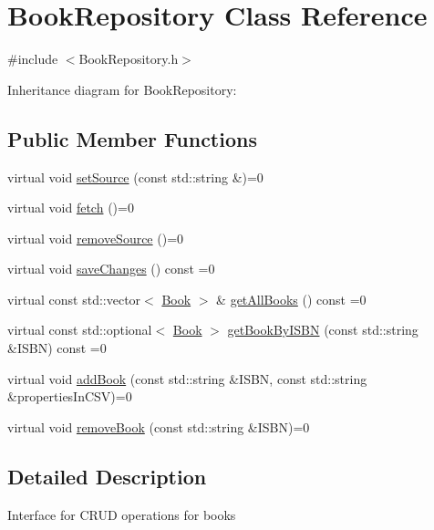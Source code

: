 \hypertarget{classBookRepository}{}\section{Book\+Repository Class Reference}
\label{classBookRepository}


{\ttfamily \#include $<$Book\+Repository.\+h$>$}



Inheritance diagram for Book\+Repository\+:
\subsection*{Public Member Functions}
\begin{DoxyCompactItemize}
\item 
virtual void \hyperlink{classBookRepository_af4ffa5253ce6cd4e0e2d24d32090daab}{set\+Source} (const std\+::string \&)=0
\item 
virtual void \hyperlink{classBookRepository_a0019e716ba40e39d2ef01e639347e8f9}{fetch} ()=0
\item 
virtual void \hyperlink{classBookRepository_ab1645ea5f97fd9d1ae5395b8234a3b7a}{remove\+Source} ()=0
\item 
virtual void \hyperlink{classBookRepository_a943be98eae0c0d4b3b453284a39653c3}{save\+Changes} () const =0
\item 
virtual const std\+::vector$<$ \hyperlink{classBook}{Book} $>$ \& \hyperlink{classBookRepository_a4cc8b9c8427d4ef32cd671b87a0d17b0}{get\+All\+Books} () const =0
\item 
virtual const std\+::optional$<$ \hyperlink{classBook}{Book} $>$ \hyperlink{classBookRepository_a0334aacb95e6bd4ff7477b9b9ba1e72f}{get\+Book\+By\+I\+S\+BN} (const std\+::string \&I\+S\+BN) const =0
\item 
virtual void \hyperlink{classBookRepository_a3147ce44d65a78bf2c2480639811a55c}{add\+Book} (const std\+::string \&I\+S\+BN, const std\+::string \&properties\+In\+C\+SV)=0
\item 
virtual void \hyperlink{classBookRepository_a2e0c4e643ea43750b99c2a380dc1e43d}{remove\+Book} (const std\+::string \&I\+S\+BN)=0
\end{DoxyCompactItemize}


\subsection{Detailed Description}
Interface for C\+R\+UD operations for books 

